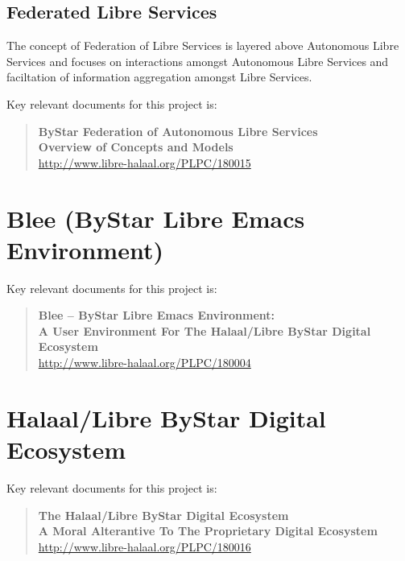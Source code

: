 
\subsection{Federated Libre Services}

The concept of Federation of Libre Services is layered above Autonomous Libre Services and
focuses on interactions amongst Autonomous Libre Services and faciltation of information
aggregation amongst Libre Services.

Key relevant documents for this project is:
\begin{quote}
  \textbf{ByStar Federation of Autonomous Libre Services}\\
  \textbf{Overview of Concepts and Models}\\
  \href{http://www.libre-halaal.org/PLPC/180015}{http://www.libre-halaal.org/PLPC/180015}
\end{quote}

\section{Blee (ByStar Libre Emacs Environment)}

Key relevant documents for this project is:

\begin{quote}
  \textbf{Blee -- ByStar Libre Emacs Environment:}\\
  \textbf{A User Environment For The Halaal/Libre ByStar Digital Ecosystem}\\
  \href{http://www.libre-halaal.org/PLPC/180004}{http://www.libre-halaal.org/PLPC/180004}
\end{quote}

\section{Halaal/Libre ByStar Digital Ecosystem}

Key relevant documents for this project is:

\begin{quote}
  \textbf{The Halaal/Libre ByStar Digital Ecosystem}\\
  \textbf{A Moral Alterantive To The Proprietary Digital Ecosystem}\\
  \href{http://www.libre-halaal.org/PLPC/180016}{http://www.libre-halaal.org/PLPC/180016}
\end{quote}

